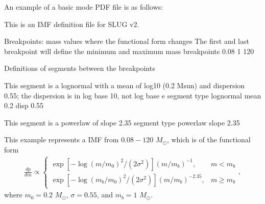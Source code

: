 \documentclass[letterpaper,10pt,english]{sphinxmanual}
\begin{document}
An example of a basic mode PDF file is as follows:

\begin{sphinxVerbatim}[commandchars=\\\{\}]
\PYGZsh{}\PYGZsh{}\PYGZsh{}\PYGZsh{}\PYGZsh{}\PYGZsh{}\PYGZsh{}\PYGZsh{}\PYGZsh{}\PYGZsh{}\PYGZsh{}\PYGZsh{}\PYGZsh{}\PYGZsh{}\PYGZsh{}\PYGZsh{}\PYGZsh{}\PYGZsh{}\PYGZsh{}\PYGZsh{}\PYGZsh{}\PYGZsh{}\PYGZsh{}\PYGZsh{}\PYGZsh{}\PYGZsh{}\PYGZsh{}\PYGZsh{}\PYGZsh{}\PYGZsh{}\PYGZsh{}\PYGZsh{}\PYGZsh{}\PYGZsh{}\PYGZsh{}\PYGZsh{}\PYGZsh{}\PYGZsh{}\PYGZsh{}\PYGZsh{}\PYGZsh{}\PYGZsh{}\PYGZsh{}\PYGZsh{}\PYGZsh{}\PYGZsh{}\PYGZsh{}\PYGZsh{}\PYGZsh{}\PYGZsh{}\PYGZsh{}\PYGZsh{}\PYGZsh{}\PYGZsh{}\PYGZsh{}\PYGZsh{}\PYGZsh{}\PYGZsh{}\PYGZsh{}\PYGZsh{}\PYGZsh{}\PYGZsh{}\PYGZsh{}
\PYGZsh{} This is an IMF definition file for SLUG v2.

\PYGZsh{} Breakpoints: mass values where the functional form changes
\PYGZsh{} The first and last breakpoint will define the minimum and
\PYGZsh{} maximum mass
breakpoints 0.08 1 120

\PYGZsh{} Definitions of segments between the breakpoints

\PYGZsh{} This segment is a lognormal with a mean of log\PYGZus{}10 (0.2 Msun)
\PYGZsh{} and dispersion 0.55; the dispersion is in log base 10, not
\PYGZsh{} log base e
segment
type lognormal
mean 0.2
disp 0.55

\PYGZsh{} This segment is a powerlaw of slope \PYGZhy{}2.35
segment
type powerlaw
slope \PYGZhy{}2.35
\end{sphinxVerbatim}

This example represents a  IMF from \(0.08 - 120\) \(M_\odot\), which is of the functional form
\begin{equation*}
\begin{split}\frac{dp}{dm} \propto \left\{\begin{array}{ll} \exp[-\log(m/m_0)^2/(2\sigma^2)] (m/m_b)^{-1} , & m < m_b \\ \exp[-\log(m_b/m_0)^2/(2\sigma^2)] (m/m_b)^{-2.35}, & m \geq m_b \end{array} \right.,\end{split}
\end{equation*}
where \(m_0 = 0.2\) \(M_\odot\), \(\sigma = 0.55\), and \(m_b = 1\) \(M_\odot\).
\end{document}
